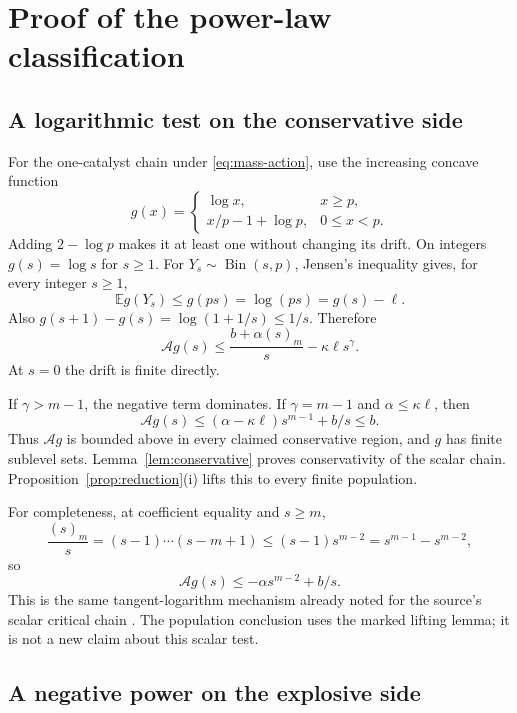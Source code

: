 \documentclass[11pt,a4paper]{article}
\theoremstyle{remark}\newtheorem{remark}[theorem]{Remark}
\newcommand{\E}{\mathbb E}
\newcommand{\A}{\mathcal A}
\begin{document}
\section{Proof of the power-law classification}\label{sec:power-proof}

\subsection{A logarithmic test on the conservative side}

For the one-catalyst chain under \eqref{eq:mass-action}, use the increasing concave function
\begin{equation}\label{eq:tangent-log}
g(x)=
\begin{cases}
\log x,&x\ge p,\\
x/p-1+\log p,&0\le x<p.
\end{cases}
\end{equation}
Adding $2-\log p$ makes it at least one without changing its drift. On integers $g(s)=\log s$ for $s\ge1$. For $Y_s\sim\operatorname{Bin}(s,p)$, Jensen's inequality gives, for every integer $s\ge1$,
\[
\E g(Y_s)\le g(ps)=\log(ps)=g(s)-\ell.
\]
Also $g(s+1)-g(s)=\log(1+1/s)\le1/s$. Therefore
\begin{equation}\label{eq:log-bound}
\A g(s)\le\frac{b+\alpha(s)_m}{s}-\kappa\ell s^\gamma.
\end{equation}
At $s=0$ the drift is finite directly.

If $\gamma>m-1$, the negative term dominates. If $\gamma=m-1$ and $\alpha\le\kappa\ell$, then
\[
\A g(s)\le(\alpha-\kappa\ell)s^{m-1}+b/s\le b.
\]
Thus $\A g$ is bounded above in every claimed conservative region, and $g$ has finite sublevel sets. Lemma~\ref{lem:conservative} proves conservativity of the scalar chain. Proposition~\ref{prop:reduction}(i) lifts this to every finite population.

For completeness, at coefficient equality and $s\ge m$,
\[
\frac{(s)_m}{s}=(s-1)\cdots(s-m+1)
 \le(s-1)s^{m-2}=s^{m-1}-s^{m-2},
\]
so
\begin{equation}\label{eq:strict-critical-log}
\A g(s)\le-\alpha s^{m-2}+b/s.
\end{equation}
This is the same tangent-logarithm mechanism already noted for the source's scalar critical chain \cite[Remark 3.13]{anderson2026}. The population conclusion uses the marked lifting lemma; it is not a new claim about this scalar test.

\subsection{A negative power on the explosive side}
\end{document}
